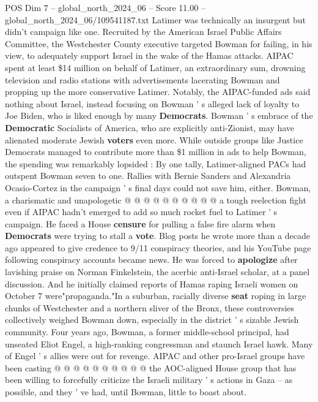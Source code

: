 \begin{textsample}{POS Dim 7 – global\_north\_2024\_06 – Score 11.00 – global\_north\_2024\_06/109541187.txt}  \label{ex:f7_pos_090}
Latimer was technically an insurgent but didn't campaign like one.
Recruited by the American Israel Public Affairs Committee, the Westchester County executive targeted Bowman for failing, in his view, to adequately support Israel in the wake of the Hamas attacks.
AIPAC spent at least \$14 million on behalf of Latimer, an extraordinary sum, drowning television and radio stations with advertisements lacerating Bowman and propping up the more conservative Latimer.
Notably, the AIPAC-funded ads said nothing about Israel, instead focusing on Bowman ' s alleged lack of loyalty to Joe Biden, who is liked enough by many \textbf{Democrats}.
Bowman ' s embrace of the \textbf{Democratic} Socialists of America, who are explicitly anti-Zionist, may have alienated moderate Jewish \textbf{voters} even more.
While outside groups like Justice Democrats managed to contribute more than \$1 million in ads to help Bowman, the spending was remarkably lopsided : By one tally, Latimer-aligned PACs had outspent Bowman seven to one.
Rallies with Bernie Sanders and Alexandria Ocasio-Cortez in the campaign ' s final days could not save him, either.
Bowman, a charismatic and unapologetic @ @ @ @ @ @ @ @ @ @ a tough reelection fight even if AIPAC hadn't emerged to add so much rocket fuel to Latimer ' s campaign.
He faced a House \textbf{censure} for pulling a false fire alarm when \textbf{Democrats} were trying to stall a \textbf{vote}.
Blog posts he wrote more than a decade ago appeared to give credence to 9/11 conspiracy theories, and his YouTube page following conspiracy accounts became news.
He was forced to \textbf{apologize} after lavishing praise on Norman Finkelstein, the acerbic anti-Israel scholar, at a panel discussion.
And he initially claimed reports of Hamas raping Israeli women on October 7 were"propaganda."In a suburban, racially diverse \textbf{seat} roping in large chunks of Westchester and a northern sliver of the Bronx, these controversies collectively weighed Bowman down, especially in the district ' s sizable Jewish community.
Four years ago, Bowman, a former middle-school principal, had unseated Eliot Engel, a high-ranking congressman and staunch Israel hawk.
Many of Engel ' s allies were out for revenge.
AIPAC and other pro-Israel groups have been casting @ @ @ @ @ @ @ @ @ @ the AOC-aligned House group that has been willing to forcefully criticize the Israeli military ' s actions in Gaza -- as possible, and they ' ve had, until Bowman, little to boast about.

\end{textsample}

